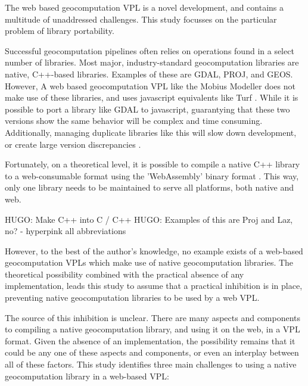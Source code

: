 The web based geocomputation VPL is a novel development, and contains a multitude of unaddressed challenges.
This study focusses on the particular problem of library portability. %

Successful geocomputation pipelines often relies on operations found in a select number of libraries. 
Most major, industry-standard geocomputation libraries are native, C++-based libraries. 
Examples of these are GDAL, PROJ, and GEOS. 
However, A web based geocomputation VPL like the Mobius Modeller does not make use of these libraries, and uses javascript equivalents like Turf \citep{turf_contributors_turfjs_2022}.
While it is possible to port a library like GDAL to javascript, guarantying that these two versions show the same behavior will be complex and time consuming. Additionally, managing duplicate libraries like this will slow down development, or create large version discrepancies \citep{ammann_maplibre-rs_2022}.

Fortunately, on a theoretical level, it is possible to compile a native C++ library to a web-consumable format using the 'WebAssembly' binary format \citep{haas_bringing_2017}.
This way, only one library needs to be maintained to serve all platforms, both native and web.

\begin{note}
  HUGO: Make C++ into C / C++ 
  HUGO: Examples of this are Proj and Laz, no? 
  - hyperpink all abbreviations
\end{note}

However, to the best of the author's knowledge, no example exists of a web-based geocomputation VPLs which make use of native geocomputation libraries.
The theoretical possibility combined with the practical absence of any implementation, leads this study to assume that a practical inhibition is in place, preventing native geocomputation libraries to be used by a web VPL.

The source of this inhibition is unclear. 
There are many aspects and components to compiling a native geocomputation library, and using it on the web, in a VPL format. 
Given the absence of an implementation, the possibility remains that it could be any one of these aspects and components, or even an interplay between all of these factors. 
This study identifies three main challenges to using a native geocomputation library in a web-based VPL:

\subsubsection*{\mySubRQTwoTitle}

